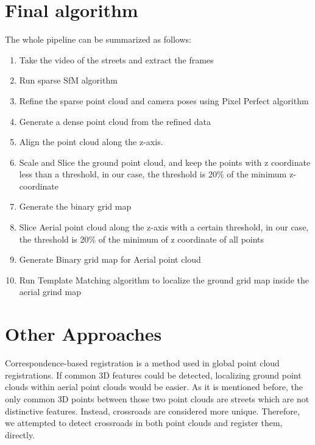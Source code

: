 \documentclass[11pt]{article}
\begin{document}
    \section{Final algorithm}
    The whole pipeline can be summarized as follows:
    \begin{enumerate}
        \item Take the video of the streets and extract the frames
        \item Run sparse SfM algorithm
        \item Refine the sparse point cloud and camera poses using Pixel Perfect algorithm
        \item Generate a dense point cloud from the refined data
        \item Align the point cloud along the z-axis.
        \item Scale and Slice the ground point cloud, and keep the points with z coordinate less than a threshold,
        in our case, the threshold is 20\% of the minimum z-coordinate
        \item Generate the binary grid map
        \item Slice Aerial point cloud along the z-axis with a certain threshold, in our case, the threshold is 20\%
        of the minimum of z coordinate of all points
        \item Generate Binary grid map for Aerial point cloud
        \item Run Template Matching algorithm to localize the ground grid map inside the aerial grind map
    \end{enumerate}

    \section{Other Approaches}
    Correspondence-based registration is a method used in global point cloud registrations. If common 3D features
    could be detected, localizing ground point clouds within aerial point clouds would be easier. As it is mentioned
    before, the only common 3D points between those two point clouds are streets which are not distinctive features.
    Instead, crossroads are considered more unique. Therefore, we attempted to detect crossroads in both
    point clouds and register them, directly.
\end{document}
